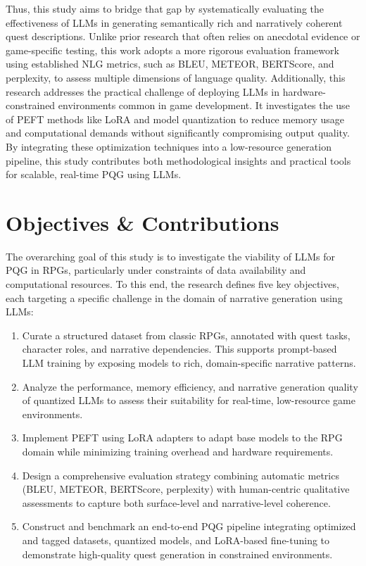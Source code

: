 Thus, this study aims to bridge that gap by systematically evaluating the effectiveness
of LLMs in generating semantically rich and narratively coherent quest descriptions.
Unlike prior research that often relies on anecdotal evidence or game-specific testing, this
work adopts a more rigorous evaluation framework using established NLG metrics, such
as BLEU, METEOR, BERTScore, and perplexity, to assess multiple dimensions of language
quality. Additionally, this research addresses the practical challenge of deploying
LLMs in hardware-constrained environments common in game development. It investigates
the use of PEFT methods like LoRA and model quantization to reduce memory
usage and computational demands without significantly compromising output quality.
By integrating these optimization techniques into a low-resource generation pipeline, this
study contributes both methodological insights and practical tools for scalable, real-time
PQG using LLMs.

\section{Objectives \& Contributions}

The overarching goal of this study is to investigate the viability of LLMs for PQG in RPGs, particularly under constraints of data availability and computational resources. To this end, the research defines five key objectives, each targeting a specific challenge in the domain of narrative generation using LLMs:

\begin{enumerate}
  \item {Curate a structured dataset from classic RPGs, annotated with quest tasks, character
        roles, and narrative dependencies. This supports prompt-based LLM training
        by exposing models to rich, domain-specific narrative patterns.}

  \item {Analyze the performance, memory efficiency, and narrative generation quality of
        quantized LLMs to assess their suitability for real-time, low-resource game environments.}

  \item {Implement PEFT using LoRA adapters to adapt base models to the RPG domain
        while minimizing training overhead and hardware requirements.}

  \item {Design a comprehensive evaluation strategy combining automatic metrics (BLEU,
        METEOR, BERTScore, perplexity) with human-centric qualitative assessments to
        capture both surface-level and narrative-level coherence.}

  \item {Construct and benchmark an end-to-end PQG pipeline integrating optimized and
        tagged datasets, quantized models, and LoRA-based fine-tuning to demonstrate
        high-quality quest generation in constrained environments.}
\end{enumerate}

